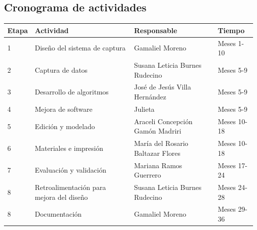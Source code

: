 \documentclass[12pt,a4paper]{article}
\begin{document}
\subsection{Cronograma de actividades}
\begin{longtable}{p{1cm} p{6cm} p{6cm} p{2.5cm}}
\toprule
Etapa & Actividad & Responsable & Tiempo \\
\midrule
1 & Diseño del sistema de captura  & Gamaliel Moreno & Meses 1-10 \\
2 & Captura de datos & Susana Leticia Burnes Rudecino & Meses 5-9 \\
3 & Desarrollo de algoritmos & José de Jesús Villa Hernández & Meses 5-9 \\
4 & Mejora de software & Julieta & Meses 5-9 \\
5 & Edición y modelado & Araceli Concepción Gamón Madriri & Meses 10-18 \\
6 & Materiales e impresión & María del Rosario Baltazar Flores& Meses 10-18 \\
7 & Evaluación y validación & Mariana Ramos Guerrero & Meses 17-24 \\
8 & Retroalimentación para mejora del diseño & Susana Leticia Burnes Rudecino & Meses 24-28 \\
8 & Documentación & Gamaliel Moreno & Meses 29-36 \\
\bottomrule
\end{longtable}
\end{document}
